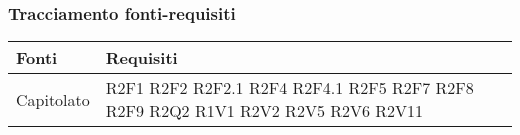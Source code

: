 \subsubsection{Tracciamento fonti-requisiti}
\begin{center}
	\centering
	\renewcommand{\arraystretch}{1.5}
	\begin{longtable}{  p{5cm} p{5cm} }
		\rowcolor{tableHeadYellow}
		\textbf{Fonti} & \textbf{Requisiti} \\
		\endhead  
		
		Capitolato & R2F1 \newline R2F2 \newline R2F2.1 \newline R2F4 \newline R2F4.1 \newline R2F5 \newline R2F7 \newline R2F8 \newline R2F9 \newline R2Q2 \newline R1V1 \newline R2V2 \newline R2V5 \newline R2V6 \newline R2V11 \\

\end{longtable}
\end{center}

